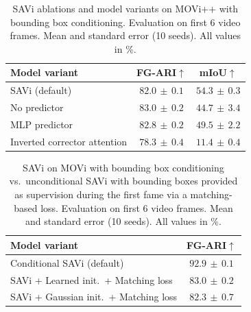 \documentclass{article}
\begin{document}
\begin{table}[htp]
\centering
\caption{SAVi ablations and model variants on MOVi++ with bounding box conditioning. Evaluation on first 6 video frames. Mean and standard error (10 seeds). All values in $\%$.}
\vspace{-1em}
\begin{tabular}{lcc} \\
\toprule
\textbf{Model variant} & \textbf{FG-ARI}$\uparrow$ & \textbf{mIoU}$\uparrow$ \\
\midrule
SAVi (default) &   $82.0 \scriptstyle{\,\pm\,0.1}$ &  $54.3 \scriptstyle{\,\pm\,0.3}$ \\
No predictor &   $83.0 \scriptstyle{\,\pm\,0.2}$ & $44.7 \scriptstyle{\,\pm\,3.4}$ \\
MLP predictor &   $82.8 \scriptstyle{\,\pm\,0.2}$ & $49.5 \scriptstyle{\,\pm\,2.2}$ \\
Inverted corrector attention &   $78.3 \scriptstyle{\,\pm\,0.4}$ & $11.4 \scriptstyle{\,\pm\,0.4}$ \\
\bottomrule
\end{tabular}
\label{table:ablations}
\end{table}

\begin{table}[b]
\centering
\caption{SAVi on MOVi with bounding box conditioning vs.~unconditional SAVi with bounding boxes provided as supervision during the first fame via a matching-based loss.  Evaluation on first 6 video frames. Mean and standard error (10 seeds). All values in $\%$.}
\vspace{-1em}
\begin{tabular}{lc} \\
\toprule
\textbf{Model variant} & \textbf{FG-ARI}$\uparrow$ \\
\midrule
Conditional SAVi (default) &   $92.9 \scriptstyle{\,\pm\,0.1}$ \\
SAVi + Learned init.~+ Matching loss &   $83.0 \scriptstyle{\,\pm\,0.2}$ \\
SAVi + Gaussian init.~+ Matching loss &   $82.3 \scriptstyle{\,\pm\,0.7}$ \\
\bottomrule
\end{tabular}
\label{table:matching}
\end{table}
\end{document}
